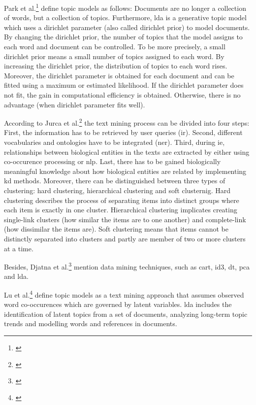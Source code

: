 Park et al.\footnote{\autocite{park_2009}} define topic models as follows: Documents are no longer a collection of words, but a collection of topics. Furthermore, \gls{lda} is a generative topic model which uses a dirichlet parameter (also called dirichlet prior) to model documents. By changing the dirichlet prior, the number of topics that the model assigns to each word and document can be controlled. To be more precisely, a small dirichlet prior means a small number of topics assigned to each word. By increasing the dirichlet prior, the distribution of topics to each word rises. Moreover, the dirichlet parameter is obtained for each document and can be fitted using a maximum or estimated likelihood. If the dirichlet parameter does not fit, the gain in computational efficiency is obtained. Otherwise, there is no advantage (when dirichlet parameter fits well).

According to Jurca et al.\footnote{\autocite{jurca_2016}} the text mining process can be divided into four steps: First, the information has to be retrieved by user queries (\gls{ir}). Second, different vocabularies and ontologies have to be integrated (\gls{ner}). Third, during \gls{ie}, relationships between biological entities in the texts are extracted by either using co-occurence processing or \gls{nlp}. Last, there has to be gained biologically meaningful knowledge about how biological entities are related by implementing \gls{kd} methods.
Moreover, there can be distinguished between three types of clustering: hard clustering, hierarchical clustering and soft clusternig. Hard clustering describes the process of separating items into distinct groups where each item is exactly in one cluster. Hierarchical clustering implicates creating single-link clusters (how similar the items are to one another) and complete-link (how dissimilar the items are). Soft clustering means that items cannot be distinctly separated into clusters and partly are member of two or more clusters at a time.  

Besides, Djatna et al.\footnote{\autocite{djatna_2018}} mention data mining techniques, such as \gls{cart}, \gls{id3}, \gls{dt}, \gls{pca} and \gls{lda}. 

Lu et al.\footnote{\autocite{lu_2016}} define topic models as a text mining approach that assumes observed word co-occurences which are governed by latent variables. \gls{lda} includes the identification of latent topics from a set of documents, analyzing long-term topic trends and modelling words and references in documents.   

